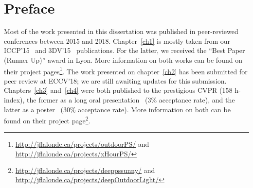 \chapter*{Preface}         %

Most of the work presented in this dissertation was published in peer-reviewed conferences between 2015 and 2018. %
Chapter~\ref{ch1} is mostly taken from our ICCP'15~\cite{holdgeoffroy-iccp-15} and 3DV'15~\cite{holdgeoffroy-3dv-15} publications. For the latter, we received the ``Best Paper (Runner Up)'' award in Lyon. More information on both works can be found on their project pages\footnote{\url{http://jflalonde.ca/projects/outdoorPS/} and \url{http://jflalonde.ca/projects/xHourPS/}}. The work presented on chapter~\ref{ch2} has been submitted for peer review at ECCV'18; we are still awaiting updates for this submission. Chapters~\ref{ch3} and~\ref{ch4} were both published to the prestigious CVPR (158 h-index), the former as a long oral presentation~\cite{holdgeoffroy-cvpr-17} (3\% acceptance rate), and the latter as a poster~\cite{holdgeoffroy-cvpr-18} (30\% acceptance rate). More information on both can be found on their project page\footnote{\url{http://jflalonde.ca/projects/deeppssunny/} and\\ \url{http://jflalonde.ca/projects/deepOutdoorLight/}}.


%
%
